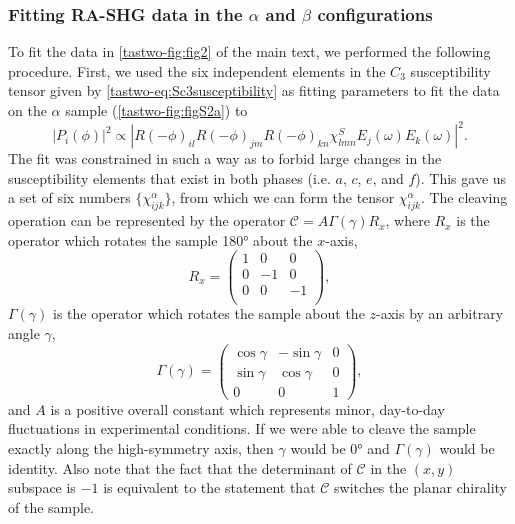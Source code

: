 \subsubsection{Fitting RA-SHG data in the $\alpha$ and $\beta$ configurations}
\label{tastwo-sec:mirrorflip}
To fit the data in \cref{tastwo-fig:fig2} of the main text, we performed the following procedure.
First, we used the six independent elements in the $C_{3}$ susceptibility tensor given by \cref{tastwo-eq:Sc3susceptibility} as fitting parameters to fit the data on the $\alpha$ sample (\cref{tastwo-fig:figS2a}) to 
\begin{equation}
|P_i(\phi)|^2 \propto |R(-\phi)_{il}R(-\phi)_{jm}R(-\phi)_{kn}\chi_{lmn}^SE_j(\omega)E_k(\omega)|^2.
\end{equation}
The fit was constrained in such a way as to forbid large changes in the susceptibility elements that exist in both phases (i.e. $a$, $c$, $e$, and $f$).
This gave us a set of six numbers $\{\chi_{ijk}^\alpha\}$, from which we can form the tensor $\chi_{ijk}^\alpha$.
The cleaving operation can be represented by the operator $\mathcal{C} = A\Gamma(\gamma)R_x$, where $R_x$ is the operator which rotates the sample \ang{180} about the $x$-axis,
\begin{equation}
\label{tastwo-eq:chiralityswitcher}
R_x = \begin{pmatrix}
1 & 0 & 0 \\
0 & -1 & 0 \\
0 & 0 & -1 \\
\end{pmatrix},
\end{equation}
$\Gamma(\gamma)$ is the operator which rotates the sample about the $z$-axis by an arbitrary angle $\gamma$,
\begin{equation}
\Gamma(\gamma) = \begin{pmatrix}
\cos{\gamma} & -\sin{\gamma} & 0 \\
\sin{\gamma} & \cos{\gamma} & 0 \\
0 & 0 & 1
\end{pmatrix},
\end{equation}
and $A$ is a positive overall constant which represents minor, day-to-day fluctuations in experimental conditions.
If we were able to cleave the sample exactly along the high-symmetry axis, then $\gamma$ would be \ang{0} and $\Gamma(\gamma)$ would be identity.
Also note that the fact that the determinant of $\mathcal{C}$ in the $(x, y)$ subspace is $-1$ is equivalent to the statement that $\mathcal{C}$ switches the planar chirality of the sample.

